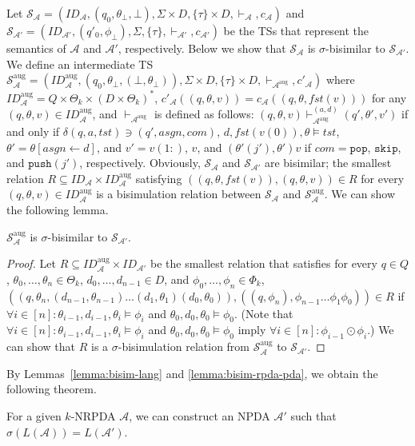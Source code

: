 \documentclass[oribibl,envcountsame,dvipdfmx]{llncs}
\newcommand{\tst}{\mathit{tst}}
\newcommand{\asgn}{\mathit{asgn}}
\renewcommand{\skip}{\mathtt{skip}}
\newcommand{\pop}{\mathtt{pop}}
\newcommand{\push}{\mathtt{push}}
\newcommand{\com}{\mathit{com}}
\newcommand{\calA}{\mathcal{A}}
\newcommand{\calS}{\mathcal{S}}
\newcommand\ID{\mathit{ID}}
\newcommand{\COMPBL}{\odot}
\newcommand{\AUG}{\mathrm{aug}}
\newcommand{\fst}{\mathit{fst}}
\newcommand{\phizero}{\phi_{\bot}}
\begin{document}
Let $\calS_{\calA}=(\ID_{\!\calA},(q_0,\theta_{\bot},\bot),
\Sigma\times D,\{\tau\}\times D,{\vdash_{\!\calA}},c_{\calA})$
and $\calS_{\calA'}=(\ID_{\!\calA'},(q'_0,\phizero),\allowbreak
\Sigma,\{\tau\},{\vdash_{\!\calA'}},c_{\calA'})$ be the TSs
that represent the semantics of $\calA$ and $\calA'$, respectively.
Below we show that $\calS_{\calA}$ is $\sigma$-bisimilar to
$\calS_{\calA'}$.
We define an intermediate TS
$\calS_{\calA}^{\AUG}=
(\ID_{\!\calA}^{\AUG},(q_0,\theta_{\bot},(\bot,\theta_{\bot})),
\Sigma\times D,\{\tau\}\times D,{\vdash_{\!\calA^{\AUG}}},c'_{\calA})$
where
$\ID_{\!\calA}^{\AUG}=Q\times\Theta_k\times(D\times\Theta_k)^*$,
$c'_{\calA}((q,\theta,v))=c_{\calA}((q,\theta,\fst(v)))$ for
any $(q,\theta,v)\in\ID_{\!\calA}^{\AUG}$,
and $\vdash_{\!\calA^{\AUG}}$ is defined as follows:
$(q,\theta,v)\vdash_{\!\calA^{\AUG}}^{(a,d)}(q',\theta',v')$
if and only if
$\delta(q,a,\tst)\ni (q',\asgn,\com)$,
$d,\fst(v(0)),\theta\models\tst$,
$\theta'=\theta[\asgn\gets d]$, and
$v'= v(1{:})$, $v$, and $(\theta'(j'),\theta')v$
if $\com=\pop$, $\skip$, and $\push(j')$, respectively.
Obviously,
$\calS_{\calA}$ and $\calS_{\calA'}$ are bisimilar;
the smallest relation $R\subseteq \ID_{\!\calA}\times\ID_{\!\calA}^{\AUG}$
satisfying
$((q,\theta,\fst(v)),\allowbreak (q,\theta,v))\in R$ 
for every $(q,\theta,v)\in\ID_{\!\calA}^{\AUG}$
is a bisimulation relation
between $\calS_{\calA}$ and $\calS_{\calA}^{\AUG}$.
We can show the following lemma.
%
\begin{lemma}\label{lemma:bisim-rpda-pda}
$\calS_{\calA}^{\AUG}$ is $\sigma$-bisimilar to
$\calS_{\calA'}$.
\end{lemma}
\begin{proof}
Let $R\subseteq \ID_{\!\calA}^{\AUG}\times\ID_{\!\calA'}$
be the smallest relation
that satisfies
for every $q\in Q$, $\theta_0,\ldots,\theta_n\in\Theta_k$,
$d_0,\ldots,d_{n-1}\in D$, and $\phi_0,\ldots,\phi_n\in\Phi_k$,
$((q,\theta_n,(d_{n-1},\theta_{n-1})\allowbreak\ldots\allowbreak
(d_1,\theta_1)(d_0,\theta_0)),
((q,\phi_n),\phi_{n-1}\ldots\phi_1\phi_0))\in R$
if
$\forall i\in[n]: \theta_{i-1},d_{i-1},\theta_i\models\phi_i$ and
$\theta_0,d_0,\theta_0\models\phi_0$.
(Note that
$\forall i\in[n]: \theta_{i-1},d_{i-1},\theta_i\models\phi_i$ and
$\theta_0,d_0,\theta_0\models\phi_0$
imply
$\forall i\in[n]: \phi_{i-1}\COMPBL\phi_i$.)
%
We can show that $R$ is a $\sigma$-bisimulation relation from
$\calS_{\calA}^{\AUG}$ to $\calS_{\calA'}$.
\end{proof}

By Lemmas~\ref{lemma:bisim-lang} and \ref{lemma:bisim-rpda-pda},
we obtain the following theorem.
\begin{theorem}
For a given $k$-NRPDA $\calA$, we can construct an NPDA $\calA'$
such that $\sigma(L(\calA))=L(\calA')$.
\end{theorem}
\end{document}
